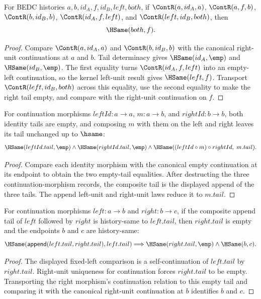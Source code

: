 \begin{theorem}
\label{thm:category-cont-left-right-identity-tail-result}
For BEDC histories $a,b,id_A,f,id_B,left,both$, if
$\ContR(a,id_A,a)$, $\ContR(a,f,b)$, $\ContR(b,id_B,b)$,
$\ContR(id_A,f,left)$, and $\ContR(left,id_B,both)$, then
$$
\HSame(both,f).
$$
\end{theorem}
\begin{proof}
Compare $\ContR(a,id_A,a)$ and $\ContR(b,id_B,b)$ with the canonical
right-unit continuations at $a$ and $b$. Tail determinacy gives
$\HSame(id_A,\emp)$ and $\HSame(id_B,\emp)$. The first equality turns
$\ContR(id_A,f,left)$ into an empty-left continuation, so the kernel
left-unit result gives $\HSame(left,f)$. Transport
$\ContR(left,id_B,both)$ across this equality, use the second equality to make
the right tail empty, and compare with the right-unit continuation on $f$.
\end{proof}

\begin{theorem}
\label{thm:continuation-morphism-left-right-identity-tail-result}
For continuation morphisms $leftId:a\to a$, $m:a\to b$, and
$rightId:b\to b$, both identity tails are empty, and composing $m$ with them
on the left and right leaves its tail unchanged up to $\hsame$:
$$
\HSame(leftId.tail,\emp)\wedge
\HSame(rightId.tail,\emp)\wedge
\HSame((leftId\circ m)\circ rightId,\;m.tail).
$$
\end{theorem}
\begin{proof}
Compare each identity morphism with the canonical empty continuation at its
endpoint to obtain the two empty-tail equalities. After destructing the three
continuation-morphism records, the composite tail is the displayed append of
the three tails. The append left-unit and right-unit laws reduce it to
$m.tail$.
\end{proof}

\begin{theorem}
\label{thm:continuation-morphism-comp-left-tail-fixed-right-identity}
For continuation morphisms $left:a\to b$ and $right:b\to c$, if the composite
append tail of $left$ followed by $right$ is history-same to $left.tail$, then
$right.tail$ is empty and the endpoints $b$ and $c$ are history-same:
$$
\HSame(\mathsf{append}(left.tail,right.tail),left.tail)
\Longrightarrow
\HSame(right.tail,\emp)\wedge\HSame(b,c).
$$
\end{theorem}
\begin{proof}
The displayed fixed-left comparison is a self-continuation of $left.tail$ by
$right.tail$. Right-unit uniqueness for continuation forces $right.tail$ to be
empty. Transporting the right morphism's continuation relation to this empty
tail and comparing it with the canonical right-unit continuation at $b$
identifies $b$ and $c$.
\end{proof}

